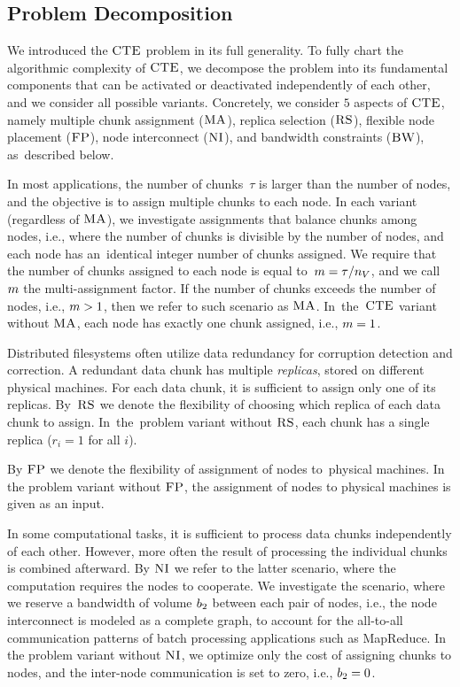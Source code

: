 \subsection{Problem Decomposition}

We introduced the $\textsc{CTE}$ problem in its full generality.
To fully chart the algorithmic complexity of $\textsc{CTE}$, we decompose the problem into its fundamental components that can be activated or deactivated independently of each other, and we consider all possible variants.
Concretely, we consider $5$ aspects of $\textsc{CTE}$, namely multiple chunk assignment ($\textsc{MA}$),
replica selection ($\textsc{RS}$), flexible node placement ($\textsc{FP}$), node interconnect ($\textsc{NI}$),
and bandwidth constraints ($\textsc{BW}$), as~described below.

In most applications, the number of chunks~$\tau$ is larger than the number of nodes, and the objective is to assign multiple chunks to each node.
In each variant (regardless of $\textsc{MA}$), we investigate assignments that balance chunks among nodes, i.e., where the number of chunks is divisible by the number of nodes, and each node has an~identical integer number of chunks assigned.
We require that the number of chunks assigned to each node is equal to~$m = \tau / n_V$, and we call $m$ the multi-assignment factor.
If the number of chunks exceeds the number of nodes, i.e., $m > 1$, then we refer to such scenario as $\textsc{MA}$.
In~the~$\textsc{CTE}$ variant without $\textsc{MA}$, each node has exactly one chunk assigned, i.e., $m = 1$.

Distributed filesystems often utilize data redundancy for corruption detection and correction.
A redundant data chunk has multiple \emph{replicas}, stored on different physical machines.
For each data chunk, it is sufficient to assign only one of its replicas.
By~$\textsc{RS}$ we denote the flexibility of choosing which replica of each data chunk to assign.
In~the~problem variant without $\textsc{RS}$, each chunk has a single replica ($r_i = 1$ for all $i$).

By $\textsc{FP}$ we denote the flexibility of assignment of nodes to~physical machines.
In the problem variant without $\textsc{FP}$, the assignment of nodes to physical machines is given as an input.

In some computational tasks, it is sufficient to process data chunks independently of each other.
However, more often the result of processing the individual chunks is combined afterward.
By $\textsc{NI}$ we refer to the latter scenario, where the computation requires the nodes to cooperate.
We investigate the scenario, where we reserve a bandwidth of volume $b_2$ between each pair of nodes, i.e., the node interconnect is modeled as a complete graph, to account for the all-to-all communication patterns of batch processing applications such as MapReduce.
In the problem variant without $\textsc{NI}$, we optimize only the cost of assigning chunks to nodes, and the inter-node communication is set to zero, i.e., $b_2 = 0$.

